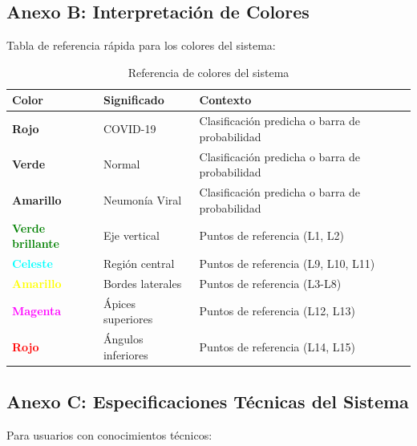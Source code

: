 \documentclass[12pt,a4paper]{article}
\begin{document}
\subsection{Anexo B: Interpretación de Colores}

Tabla de referencia rápida para los colores del sistema:

\begin{table}[H]
\centering
\begin{tabular}{|l|l|p{6cm}|}
\hline
\textbf{Color} & \textbf{Significado} & \textbf{Contexto} \\
\hline
\textcolor{covidred}{\textbf{Rojo}} & COVID-19 & Clasificación predicha o barra de probabilidad \\
\hline
\textcolor{normalgreen}{\textbf{Verde}} & Normal & Clasificación predicha o barra de probabilidad \\
\hline
\textcolor{virusyellow}{\textbf{Amarillo}} & Neumonía Viral & Clasificación predicha o barra de probabilidad \\
\hline
\textcolor{green}{\textbf{Verde brillante}} & Eje vertical & Puntos de referencia (L1, L2) \\
\hline
\textcolor{cyan}{\textbf{Celeste}} & Región central & Puntos de referencia (L9, L10, L11) \\
\hline
\textcolor{yellow}{\textbf{Amarillo}} & Bordes laterales & Puntos de referencia (L3-L8) \\
\hline
\textcolor{magenta}{\textbf{Magenta}} & Ápices superiores & Puntos de referencia (L12, L13) \\
\hline
\textcolor{red}{\textbf{Rojo}} & Ángulos inferiores & Puntos de referencia (L14, L15) \\
\hline
\end{tabular}
\caption{Referencia de colores del sistema}
\end{table}

\subsection{Anexo C: Especificaciones Técnicas del Sistema}

Para usuarios con conocimientos técnicos:
\end{document}
